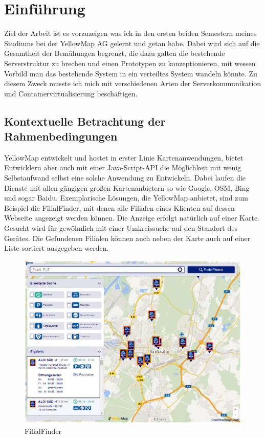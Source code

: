 \documentclass[12pt,a4paper]{scrartcl}
\begin{document}
\section{Einf\"uhrung}
Ziel der Arbeit ist es vorzuzeigen was ich in den ersten beiden Semestern meines Studiums bei der YellowMap AG gelernt und getan habe. Dabei wird sich auf die Gesamtheit der Bemühungen begrenzt, die dazu galten die bestehende Serverstruktur zu brechen und einen Prototypen zu konzeptionieren, mit wessen Vorbild man das bestehende System in ein verteiltes System wandeln könnte. Zu diesem Zweck musste ich mich mit verschiedenen Arten der Serverkommunikation und Containervirtualisierung beschäftigen.

\subsection{Kontextuelle Betrachtung der Rahmenbedingungen}

YellowMap entwickelt und hostet in erster Linie Kartenanwendungen, bietet Entwicklern aber auch mit einer Java-Script-API die Möglichkeit mit wenig Selbstaufwand selbst eine solche Anwendung zu Entwickeln. Dabei laufen die Dienste mit allen gängigen großen Kartenanbietern so wie Google, OSM, Bing und sogar Baidu. Exemplarische Lösungen, die YellowMap anbietet, sind zum Beispiel die FilialFinder, mit denen alle Filialen eines Klienten auf dessen Webseite angezeigt werden können. Die Anzeige erfolgt natürlich auf einer Karte. Gesucht wird für gewöhnlich mit einer Umkreissuche auf den Standort des Gerätes. Die Gefundenen Filialen können auch neben der Karte auch auf einer Liste sortiert ausgegeben werden.

\begin{figure}[h!]
	\centering
	\includegraphics[scale=0.55]{YmFF.png}
	\caption[https://www.aldi-sued.de/filialen/ (Stand 28.08.2020)]{FilialFinder}
\end{figure}
\end{document}
